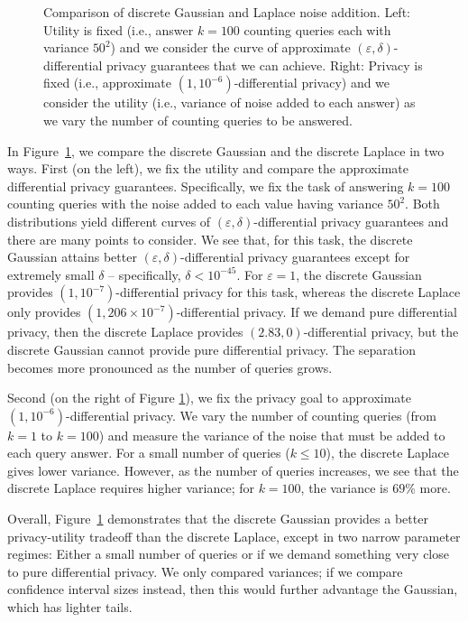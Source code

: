 \documentclass{jpcfinal} %
\begin{document}
\begin{figure}[ht!]
\begin{minipage}{0.5\textwidth}
    \end{minipage}
    \caption{\label{fig:gausslaplace} Comparison of discrete Gaussian and Laplace noise addition. Left: Utility is fixed (i.e., answer $k=100$ counting queries each with variance $50^2$) and we consider the curve of approximate $(\varepsilon,\delta)$-differential privacy guarantees that we can achieve. Right: Privacy is fixed (i.e., approximate $(1,10^{-6})$-differential privacy) and we consider the utility (i.e., variance of noise added to each answer) as we vary the number of counting queries to be answered.}
\end{figure}

In Figure~\ref{fig:gausslaplace}, we compare the discrete Gaussian and the discrete Laplace in two ways. First (on the left), we fix the utility and compare the approximate differential privacy guarantees. Specifically, we fix the task of answering $k=100$ counting queries with the noise added to each value having variance $50^2$. Both distributions yield different curves of $(\varepsilon,\delta)$-differential privacy guarantees and there are many points to consider. We see that, for this task, the discrete Gaussian attains better $(\varepsilon,\delta)$-differential privacy guarantees except for extremely small $\delta$ -- specifically, $\delta<10^{-45}$. For $\varepsilon=1$, the discrete Gaussian provides $(1,10^{-7})$-differential privacy for this task, whereas the discrete Laplace only provides $(1,206 \times 10^{-7})$-differential privacy. If we demand pure differential privacy, then the discrete Laplace provides $(2.83,0)$-differential privacy, but the discrete Gaussian cannot provide pure differential privacy. The separation becomes more pronounced as the number of queries grows.

Second (on the right of Figure \ref{fig:gausslaplace}), we fix the privacy goal to approximate $(1,10^{-6})$-differential privacy. We vary the number of counting queries (from $k=1$ to $k=100$) and measure the variance of the noise that must be added to each query answer. For a small number of queries ($k \le 10$), the discrete Laplace gives lower variance. However, as the number of queries increases, we see that the discrete Laplace requires higher variance; for $k=100$, the variance is $69\%$ more.

Overall, Figure~\ref{fig:gausslaplace} demonstrates that the discrete Gaussian provides a better privacy-utility tradeoff than the discrete Laplace, except in two narrow parameter regimes: Either a small number of queries or if we demand something very close to pure differential privacy. We only compared variances; if we compare confidence interval sizes instead, then this would further advantage the Gaussian, which has lighter tails.
\end{document}
